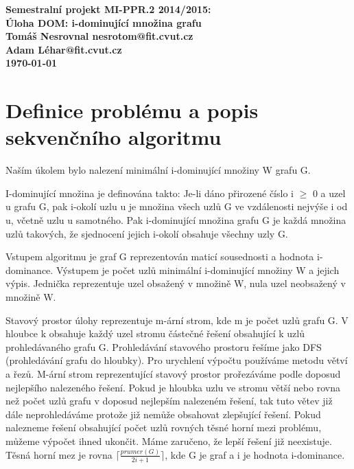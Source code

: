 \documentclass[12pt]{article}
\begin{document}

\begin{center}
\bf Semestralní projekt MI-PPR.2 2014/2015:\\[5mm]
    Úloha DOM: i-dominující množina grafu\\[5mm]
       Tomáš Nesrovnal nesrotom@fit.cvut.cz\\
       Adam Léhar@fit.cvut.cz\\[2mm]
\today
\end{center}

\section{Definice problému a popis sekvenčního algoritmu}
Naším úkolem bylo nalezení minimální i-dominující množiny W grafu G.

I-dominující množina je definována takto: Je-li dáno přirozené číslo i $\geq$ 0 a uzel u grafu G, pak i-okolí uzlu u je množina všech uzlů G ve vzdálenosti nejvýše i od u, včetně uzlu u samotného. Pak i-dominující množina grafu G je každá množina uzlů takových, že sjednocení jejich i-okolí obsahuje všechny uzly G.

Vstupem algoritmu je graf G reprezentován maticí sousednosti a hodnota i-dominance. Výstupem je počet uzlů minimální i-dominující množiny W a jejich výpis. Jednička reprezentuje uzel obsažený v množině W, nula uzel neobsažený v množině W.

Stavový prostor úlohy reprezentuje m-ární strom, kde m je počet uzlů grafu G. V hloubce k obsahuje každý uzel stromu částečné řešení obsahující k uzlů prohledávaného grafu G. Prohledávání stavového prostoru řešíme jako DFS (prohledávání grafu do hloubky). Pro urychlení výpočtu používáme metodu větví a řezů. M-ární strom reprezentující stavový prostor prořezáváme podle doposud nejlepšího nalezeného řešení. Pokud je hloubka uzlu ve stromu větší nebo rovna než počet uzlů grafu v doposud nejlepším nalezeném řešení, tak tuto větev již dále neprohledáváme protože již nemůže obsahovat zlepšující řešení. Pokud nalezneme řešení obsahující počet uzlů rovných těsné horní mezi problému, můžeme výpočet ihned ukončit. Máme zaručeno, že lepší řešení již neexistuje. Těsná horní mez je rovna $\lceil\frac{prumer(G)}{2i+1}\rceil$, kde G je graf a i je hodnota i-dominance.
\end{document}
